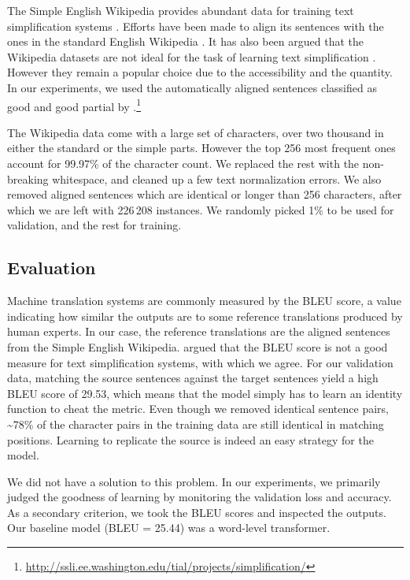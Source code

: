 \documentclass[11pt,twocolumn]{article}
\begin{document}
The Simple English Wikipedia provides abundant data
for training text simplification systems \parencite{napoles2010learning}.
Efforts have been made to align its sentences with the ones in the standard English Wikipedia
\parencite{coster2011simple, hwang2015aligning}.
It has also been argued that the Wikipedia datasets are not ideal for the task
of learning text simplification \parencite{xu2015problems}.
However they remain a popular choice due to the accessibility and the quantity.
In our experiments, we used the automatically aligned sentences classified as good and good partial
by \textcite{hwang2015aligning}.\footnote{\tiny\url{http://ssli.ee.washington.edu/tial/projects/simplification/}}

The Wikipedia data come with a large set of characters,
over two thousand in either the standard or the simple parts.
However the top 256 most frequent ones account for 99.97\% of the character count.
We replaced the rest with the non-breaking whitespace,
and cleaned up a few text normalization errors.
We also removed aligned sentences which are identical or longer than 256 characters,
after which we are left with 226\,208 instances.
We randomly picked 1\% to be used for validation,
and the rest for training.

\subsection{Evaluation}

Machine translation systems are commonly measured by the BLEU score,
a value indicating how similar the outputs are to some reference translations produced by human experts.
In our case, the reference translations are the aligned sentences from the Simple English Wikipedia.
\textcite{vstajner2015deeper} argued that the BLEU score is not a good measure for text simplification systems,
with which we agree.
For our validation data, matching the source sentences against the target sentences yield a high BLEU score of 29.53,
which means that the model simply has to learn an identity function to cheat the metric.
Even though we removed identical sentence pairs,
\textasciitilde{}78\% of the character pairs in the training data are still identical in matching positions.
Learning to replicate the source is indeed an easy strategy for the model.

We did not have a solution to this problem.
In our experiments, we primarily judged the goodness of learning by monitoring the validation loss and accuracy.
As a secondary criterion, we took the BLEU scores and inspected the outputs.
Our baseline model (BLEU = 25.44) was a word-level transformer.
\end{document}
